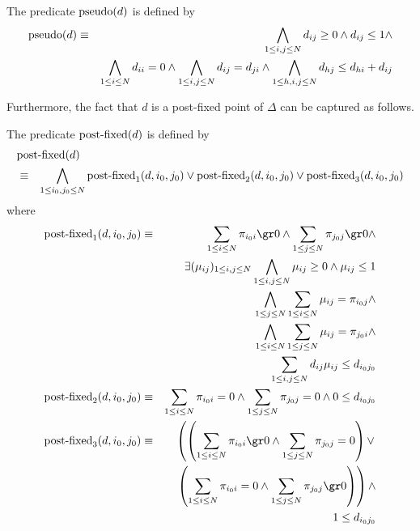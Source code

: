 \documentclass{LMCS}
\begin{document}
\begin{defi}
The predicate $\mbox{\rm pseudo}(d)$ is defined by
\begin{eqnarray*}
\mbox{\rm pseudo}(d) 
& \equiv & \bigwedge_{1 \le i, j \le N} d_{ij} \ge 0 \wedge d_{ij} \le 1 \wedge\\
&        & \bigwedge_{1 \le i \le N} d_{ii}  = 0 \wedge
           \bigwedge_{1 \le i, j \le N} d_{ij}  = d_{ji} \wedge
           \bigwedge_{1 \le h, i, j \le N} d_{hj} \le d_{hi} + d_{ij}
\end{eqnarray*}
\end{defi}

Furthermore, the fact that $d$ is a post-fixed point of $\Delta$ can be captured as follows.

\begin{defi}
The predicate $\mbox{\rm post-fixed}(d)$ is defined by
\begin{eqnarray*}
\lefteqn{\mbox{\rm post-fixed}(d)}\\
& \equiv &
\bigwedge_{1 \le i_0, j_0 \le N}
\mbox{\rm post-fixed}_1(d, i_0, j_0) \vee
\mbox{\rm post-fixed}_2(d, i_0, j_0) \vee
\mbox{\rm post-fixed}_3(d, i_0, j_0)
\end{eqnarray*}
where
\begin{eqnarray*}
\mbox{\rm post-fixed}_1(d, i_0, j_0)
& \equiv & \sum_{1 \le i \le N} \pi_{i_0 i} \gr 0 \wedge
           \sum_{1 \le j \le N} \pi_{j_0 j} \gr 0 \wedge\\
&        & \exists (\mu_{ij})_{1\leq i,j \leq N} \bigwedge_{1 \leq i, j \leq N} \mu_{ij} \geq 0 \wedge \mu_{ij} \leq 1\\
&        & \phantom{\exists (\mu_{ij})_{1\leq i,j \leq N}} \bigwedge_{1 \le j \le N} \sum_{1 \le i \le N} \mu_{ij} = \pi_{i_0 j} \wedge\\
&        & \phantom{\exists (\mu_{ij})_{1\leq i,j \leq N}} \bigwedge_{1 \le i \le N} \sum_{1 \le j \le N} \mu_{ij} = \pi_{j_0 i} \wedge\\
&        & \phantom{\exists (\mu_{ij})_{1\leq i,j \leq N}} \sum_{1 \le i, j \le N} d_{ij} \mu_{ij} \le d_{i_0 j_0}\\
\mbox{\rm post-fixed}_2(d, i_0, j_0)
& \equiv & \sum_{1 \le i \le N} \pi_{i_0 i} = 0 \wedge
           \sum_{1 \le j \le N} \pi_{j_0 j} = 0 \wedge
           0 \le d_{i_0 j_0}\\
\mbox{\rm post-fixed}_3(d, i_0, j_0)
& \equiv & \left ( \left (\sum_{1 \le i \le N} \pi_{i_0 i} \gr 0 \wedge
             \sum_{1 \le j \le N} \pi_{j_0 j} = 0 \right ) \vee \right . \\
&& \phantom{\left ( \right .} \left .
            \left (\sum_{1 \le i \le N} \pi_{i_0 i} = 0 \wedge
             \sum_{1 \le j \le N} \pi_{j_0 j} \gr 0 \right ) \right ) \wedge\\
&&         1 \le d_{i_0 j_0}
\end{eqnarray*}
\end{defi}
\end{document}
